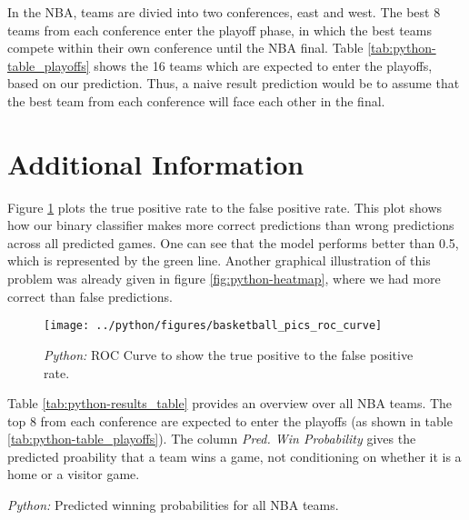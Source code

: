 \documentclass[11pt, a4paper, leqno]{article}
\begin{document}
In the NBA, teams are divied into two conferences, east and west. The best 8 teams from each conference enter the playoff phase, in which the best teams compete within their own conference until the NBA final.
Table \ref{tab:python-table_playoffs} shows the 16 teams which are expected to enter the playoffs, based on our prediction. Thus, a naive result prediction would be to assume that the best team from each conference will face each other in the final.
\clearpage
\section{Additional Information}

Figure \ref{fig:python-roc_curve} plots the true positive rate to the false positive rate. This plot shows how our binary classifier makes more correct predictions than wrong predictions across all predicted games. One can see that the model performs better than 0.5, which is represented by the green line. Another graphical illustration of this problem was already given in figure \ref{fig:python-heatmap}, where we had more correct than false predictions.

\begin{figure}[H]
   \centering
    \caption{\emph{Python:} ROC Curve to show the true positive to the false positive rate.}
    \texttt{[image: ../python/figures/basketball\_pics\_roc\_curve]}
    \label{fig:python-roc_curve}

\end{figure}
Table \ref{tab:python-results_table} provides an overview over all NBA teams. The top 8 from each conference are expected to enter the playoffs (as shown in table \ref{tab:python-table_playoffs}). The column \textit{Pred. Win Probability} gives the predicted proability that a team wins a game, not conditioning on whether it is a home or a visitor game.
\begin{table}[H]

    \caption{\label{tab:python-results_table}\emph{Python:} Predicted winning probabilities for all NBA teams.}
    \begin{adjustbox}{width=\columnwidth,center}
    
\end{adjustbox}
\end{table}




\printbibliography
{}
\end{document}

